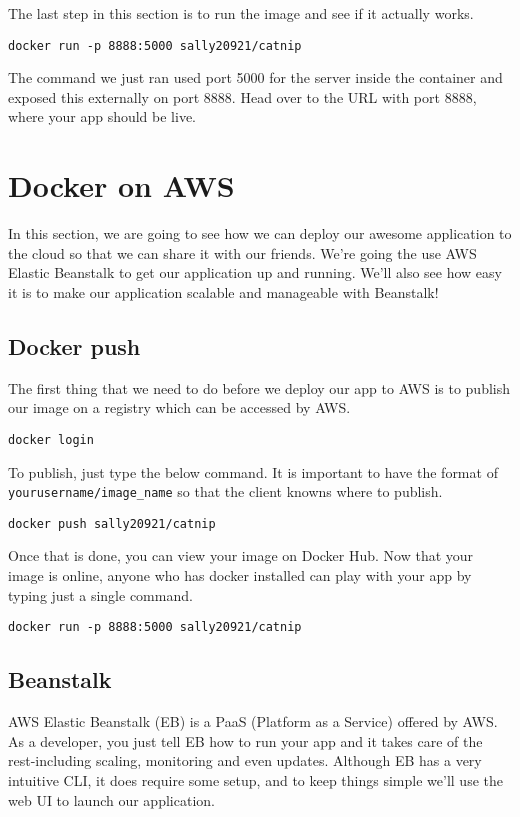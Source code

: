 \documentclass[twoside,twocolumn]{article}
\begin{document}
The last step in this section is to run the image and see if it actually works.
\begin{verbatim}
docker run -p 8888:5000 sally20921/catnip
\end{verbatim}
The command we just ran used port 5000 for the server inside the container and exposed this externally on port 8888. Head over to the URL with port 8888, where your app should be live.

\section{Docker on AWS}
In this section, we are going to see how we can deploy our awesome application to the cloud so that we can share it with our friends.
We're going the use AWS Elastic Beanstalk to get our application up and running. We'll also see how easy it is to make our application scalable and manageable with Beanstalk!

\subsection{Docker push}
The first thing that we need to do before we deploy our app to AWS is to publish our image on a registry which can be accessed by AWS.
\begin{verbatim}
docker login
\end{verbatim}
To publish, just type the below command. It is important to have the format of \texttt{yourusername/image_name} so that the client knowns where to publish.
\begin{verbatim}
docker push sally20921/catnip
\end{verbatim}
Once that is done, you can view your image on Docker Hub. 
Now that your image is online, anyone who has docker installed can play with your app by typing just a single command.
\begin{verbatim}
docker run -p 8888:5000 sally20921/catnip
\end{verbatim}

\subsection{Beanstalk}
AWS Elastic Beanstalk (EB) is a PaaS (Platform as a Service) offered by AWS. 
As a developer, you just tell EB how to run your app and it takes care of the rest-including scaling, monitoring and even updates.
Although EB has a very intuitive CLI, it does require some setup, and to keep things simple we'll use the web UI to launch our application.
\end{document}
